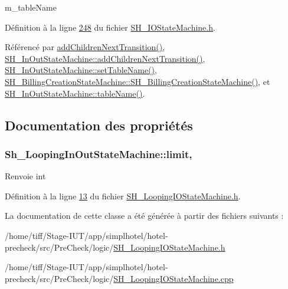 m\-\_\-table\-Name 



Définition à la ligne \hyperlink{SH__IOStateMachine_8h_source_l00248}{248} du fichier \hyperlink{SH__IOStateMachine_8h_source}{S\-H\-\_\-\-I\-O\-State\-Machine.\-h}.



Référencé par \hyperlink{classSh__LoopingInOutStateMachine_a20d5e4d9feea63bea747b45b7c10ca01}{add\-Children\-Next\-Transition()}, \hyperlink{classSH__InOutStateMachine_aa78420f8778d7777809aad77eb8473b4}{S\-H\-\_\-\-In\-Out\-State\-Machine\-::add\-Children\-Next\-Transition()}, \hyperlink{classSH__InOutStateMachine_a95db31a7e7f31f36a8737adc739ab08c}{S\-H\-\_\-\-In\-Out\-State\-Machine\-::set\-Table\-Name()}, \hyperlink{classSH__BillingCreationStateMachine_ad62b77fa4aeafe200056ff3974562f83}{S\-H\-\_\-\-Billing\-Creation\-State\-Machine\-::\-S\-H\-\_\-\-Billing\-Creation\-State\-Machine()}, et \hyperlink{classSH__InOutStateMachine_a4288a6c86ddf83effefff886675591c9}{S\-H\-\_\-\-In\-Out\-State\-Machine\-::table\-Name()}.



\subsection{Documentation des propriétés}
\hypertarget{classSh__LoopingInOutStateMachine_aa015094a00155fc04a1859da5545acc9}{
\subsubsection[{limit}]{\setlength{\rightskip}{0pt plus 5cm}Sh\-\_\-\-Looping\-In\-Out\-State\-Machine\-::limit\hspace{0.3cm}{\ttfamily [read]}, {\ttfamily [write]}}}\label{classSh__LoopingInOutStateMachine_aa015094a00155fc04a1859da5545acc9}
\begin{DoxyReturn}{Renvoie}
int 
\end{DoxyReturn}


Définition à la ligne \hyperlink{SH__LoopingIOStateMachine_8h_source_l00013}{13} du fichier \hyperlink{SH__LoopingIOStateMachine_8h_source}{S\-H\-\_\-\-Looping\-I\-O\-State\-Machine.\-h}.



La documentation de cette classe a été générée à partir des fichiers suivants \-:\begin{DoxyCompactItemize}
\item 
/home/tiff/\-Stage-\/\-I\-U\-T/app/simplhotel/hotel-\/precheck/src/\-Pre\-Check/logic/\hyperlink{SH__LoopingIOStateMachine_8h}{S\-H\-\_\-\-Looping\-I\-O\-State\-Machine.\-h}\item 
/home/tiff/\-Stage-\/\-I\-U\-T/app/simplhotel/hotel-\/precheck/src/\-Pre\-Check/logic/\hyperlink{SH__LoopingIOStateMachine_8cpp}{S\-H\-\_\-\-Looping\-I\-O\-State\-Machine.\-cpp}\end{DoxyCompactItemize}
